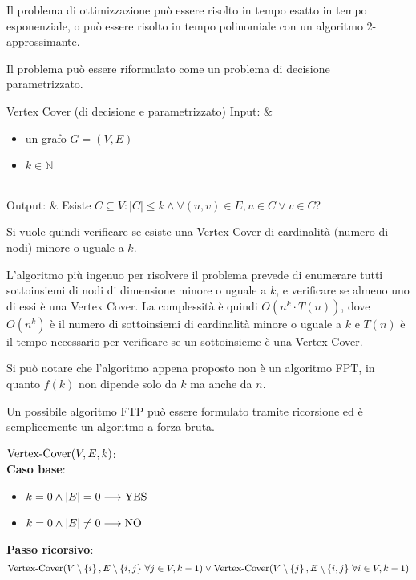 Il problema di ottimizzazione può essere risolto in tempo esatto in tempo esponenziale, o può essere risolto in tempo polinomiale con un algoritmo $2$-approssimante.

Il problema può essere riformulato come un problema di decisione parametrizzato.
\begin{problem}[lined]{Vertex Cover (di decisione e parametrizzato)}
    Input: & \begin{minipage}[t]{0.8\linewidth}\begin{itemize}
        \setlength\itemsep{0em}
        \item un grafo $G = (V, E)$
        \item $k \in \mathbb{N}$ 
    \end{itemize}\end{minipage}\\
    Output: & Esiste $C \subseteq V : |C| \le k \land \forall (u, v) \in E, u \in C \lor v \in C$?
\end{problem}
Si vuole quindi verificare se esiste una Vertex Cover di cardinalità (numero di nodi) minore o uguale a $k$.

L'algoritmo più ingenuo per risolvere il problema prevede di enumerare tutti sottoinsiemi di nodi di dimensione minore o uguale a $k$, e verificare se almeno uno di essi è una Vertex Cover. 
La complessità è quindi $O(n^k \cdot T(n))$, dove $O(n^k)$ è il numero di sottoinsiemi di cardinalità minore o uguale a $k$ e $T(n)$ è il tempo necessario per verificare se un sottoinsieme è una Vertex Cover.

Si può notare che l'algoritmo appena proposto non è un algoritmo FPT, in quanto $f(k)$ non dipende solo da $k$ ma anche da $n$.

Un possibile algoritmo FTP può essere formulato tramite ricorsione ed è semplicemente un algoritmo a forza bruta.

$\textnormal{Vertex-Cover}(V, E, k)$:\\
\textbf{Caso base}: 
    \begin{minipage}[t]
    {0.8\linewidth}\begin{itemize}
        \setlength\itemsep{0em}
        \item $k = 0 \land |E| = 0 \longrightarrow \textnormal{YES}$
        \item $k = 0 \land |E| \neq 0 \longrightarrow \textnormal{NO}$
    \end{itemize}\end{minipage}
    
\textbf{Passo ricorsivo}:
    \[
        \textnormal{Vertex-Cover}(V \setminus \left\{i\right\}, E \setminus \left\{i, j\right\} \, \forall j \in V, k-1) \lor \textnormal{Vertex-Cover}(V \setminus \left\{j\right\}, E \setminus \left\{i, j\right\} \, \forall i \in V, k-1)
    \]

